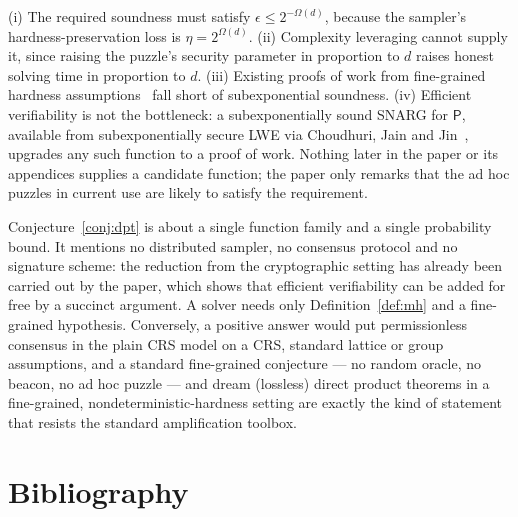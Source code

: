 \documentclass{conjura-conjecture}
\begin{document}
\begin{remark}
(i) The required soundness must satisfy $\epsilon \le 2^{-\Omega(d)}$, because the sampler's hardness-preservation loss is $\eta = 2^{\Omega(d)}$. (ii) Complexity leveraging cannot supply it, since raising the puzzle's security parameter in proportion to $d$ raises honest solving time in proportion to $d$. (iii) Existing proofs of work from fine-grained hardness assumptions~\cite{BGH24a} fall short of subexponential soundness. (iv) Efficient verifiability is not the bottleneck: a subexponentially sound SNARG for $\mathsf{P}$, available from subexponentially secure LWE via Choudhuri, Jain and Jin~\cite{CJJ21}, upgrades any such function to a proof of work. Nothing later in the paper or its appendices supplies a candidate function; the paper only remarks that the ad hoc puzzles in current use are likely to satisfy the requirement.
\end{remark}

\begin{remark}
Conjecture~\ref{conj:dpt} is about a single function family and a single probability bound. It mentions no distributed sampler, no consensus protocol and no signature scheme: the reduction from the cryptographic setting has already been carried out by the paper, which shows that efficient verifiability can be added for free by a succinct argument. A solver needs only Definition~\ref{def:mh} and a fine-grained hypothesis. Conversely, a positive answer would put permissionless consensus in the plain CRS model on a CRS, standard lattice or group assumptions, and a standard fine-grained conjecture --- no random oracle, no beacon, no ad hoc puzzle --- and dream (lossless) direct product theorems in a fine-grained, nondeterministic-hardness setting are exactly the kind of statement that resists the standard amplification toolbox.
\end{remark}

\section{Bibliography}
\end{document}
